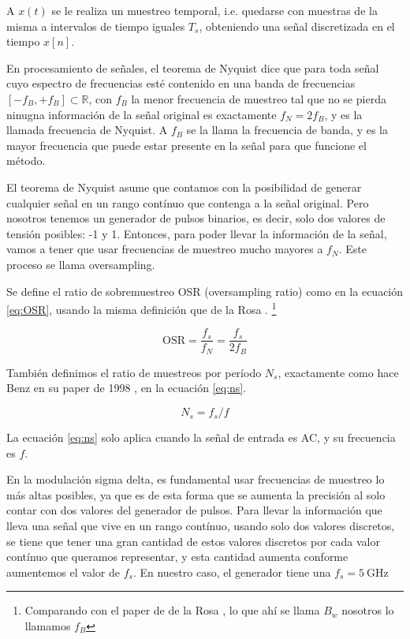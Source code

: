 \documentclass[twoside]{article}
\begin{document}
\begin{multicols}{2}
A $x(t)$ se le realiza un muestreo temporal, i.e. quedarse con muestras de la misma a intervalos de tiempo iguales $T_s$, obteniendo una señal discretizada en el tiempo $x[n]$.

En procesamiento de señales, el teorema de Nyquist \cite{oppenheim} dice que para toda señal cuyo espectro de frecuencias esté contenido en una banda de frecuencias $[-f_B,+f_B]\subset \mathbb{R}$, con $f_B$ la menor frecuencia de muestreo tal que no se pierda ninugna información de la señal original es exactamente $f_N = 2 f_B$, y es la llamada frecuencia de Nyquist. A $f_B$ se la llama la frecuencia de banda, y es la mayor frecuencia que puede estar presente en la señal para que funcione el método.

El teorema de Nyquist asume que contamos con la posibilidad de generar cualquier señal en un rango contínuo que contenga a la señal original. Pero nosotros tenemos un generador de pulsos binarios, es decir, solo dos valores de tensión posibles: -1 y 1. Entonces, para poder llevar la información de la señal, vamos a tener que usar frecuencias de muestreo mucho mayores a $f_N$. Este proceso se llama oversampling. 

Se define el ratio de sobremuestreo OSR (oversampling ratio) como en la ecuación \ref{eq:OSR}, usando la misma definición que de la Rosa \cite{delarosa2011}. \footnote{Comparando con el paper de de la Rosa \cite{delarosa2011}, lo que ahí se llama $B_w$ nosotros lo llamamos $f_B$}

\begin{equation}
    \text{OSR} = \frac{f_s}{f_N} = \frac{f_s}{2 f_B}
    \label{eq:OSR}
\end{equation}

También definimos el ratio de muestreos por período $N_s$, exactamente como hace Benz en su paper de 1998 \cite{benz1998}, en la ecuación \ref{eq:ns}.

\begin{equation}
    N_s = f_s/f
    \label{eq:ns}
\end{equation}

La ecuación \ref{eq:ns} solo aplica cuando la señal de entrada es AC, y su frecuencia es $f$.

En la modulación sigma delta, es fundamental usar frecuencias de muestreo lo más altas posibles, ya que es de esta forma que se aumenta la precisión al solo contar con dos valores del generador de pulsos. Para llevar la información que lleva una señal que vive en un rango contínuo, usando solo dos valores discretos, se tiene que tener una gran cantidad de estos valores discretos por cada valor contínuo que queramos representar, y esta cantidad aumenta conforme aumentemos el valor de $f_s$. En nuestro caso, el generador tiene una $f_s = \SI{5}{\giga\hertz}$




\end{multicols}
\end{document}
